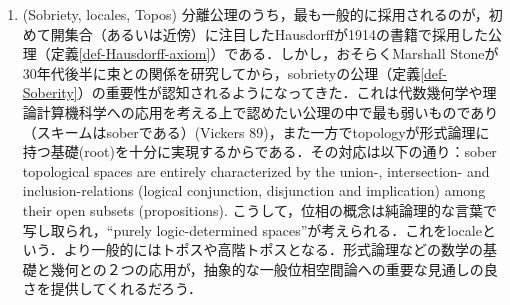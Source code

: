 \documentclass[uplatex,dvipdfmx]{jsreport}
\begin{document}
\begin{remark}[Tikhonovの分離公理のはなし]
\begin{enumerate}
        \item (Sobriety, locales, Topos) 分離公理のうち，最も一般的に採用されるのが，初めて開集合（あるいは近傍）に注目したHausdorffが1914の書籍\cite{Hausdorff}で採用した公理（定義\ref{def-Hausdorff-axiom}）である．しかし，おそらくMarshall Stoneが30年代後半に束との関係を研究してから，sobrietyの公理（定義\ref{def-Soberity}）の重要性が認知されるようになってきた．これは代数幾何学や理論計算機科学への応用を考える上で認めたい公理の中で最も弱いものであり（スキームはsoberである）(Vickers 89)\cite{Vickers}，また一方でtopologyが形式論理に持つ基礎(root)を十分に実現するからである．その対応は以下の通り：sober topological spaces are entirely characterized by the union-, intersection- and inclusion-relations (logical conjunction, disjunction and implication) among their open subsets (propositions).
        こうして，位相の概念は純論理的な言葉で写し取られ，“purely logic-determined spaces”が考えられる．これをlocaleという．より一般的にはトポスや高階トポスとなる．形式論理などの数学の基礎と幾何との２つの応用が，抽象的な一般位相空間論への重要な見通しの良さを提供してくれるだろう．
    \end{enumerate}
\end{remark}
\end{document}
